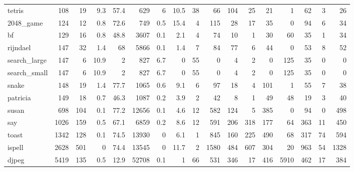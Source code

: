 \begin{tabular}{lrrrrrrrrrrrrrrrr}
 tetris          &      108 &   19 &    9.3 &     57.4 &     629 &    6   &     10.5 &    38 &      66 &  104 &    25 &    21 &     1 &    62 &      3 &        26 \\
 2048\_game       &      124 &   12 &    0.8 &     72.6 &     749 &    0.5 &     15.4 &     4 &     115 &   28 &    17 &    35 &     0 &    94 &      6 &        34 \\
 bf              &      129 &   16 &    0.8 &     48.8 &    3607 &    0.1 &      2.1 &     4 &      74 &   10 &     1 &    30 &    60 &    35 &      1 &        34 \\
 rijndael        &      147 &   32 &    1.4 &     68   &    5866 &    0.1 &      1.4 &     7 &      84 &   77 &     6 &    44 &     0 &    53 &      8 &        52 \\
 search\_large    &      147 &    6 &   10.9 &      2   &     827 &    6.7 &      0   &    55 &       0 &    4 &     2 &     0 &   125 &    35 &      0 &         0 \\
 search\_small    &      147 &    6 &   10.9 &      2   &     827 &    6.7 &      0   &    55 &       0 &    4 &     2 &     0 &   125 &    35 &      0 &         0 \\
 snake           &      148 &   19 &    1.4 &     77.7 &    1065 &    0.6 &      9.1 &     6 &      97 &   18 &     4 &   101 &     1 &    55 &      7 &        38 \\
 patricia        &      149 &   18 &    0.7 &     46.3 &    1087 &    0.2 &      3.9 &     2 &      42 &    8 &     1 &    49 &    48 &    19 &      3 &        40 \\
 susan           &      698 &  104 &    0.1 &     77.2 &   12656 &    0.1 &      4.6 &    12 &     582 &  124 &     5 &   385 &     0 &    94 &      0 &       498 \\
 say             &     1026 &  159 &    0.5 &     67.1 &    6859 &    0.2 &      8.6 &    12 &     591 &  206 &   318 &   177 &    64 &   363 &     11 &       450 \\
 toast           &     1342 &  128 &    0.1 &     74.5 &   13930 &    0   &      6.1 &     1 &     845 &  160 &   225 &   490 &    68 &   317 &     74 &       594 \\
 ispell          &     2628 &  501 &    0   &     74.4 &   13545 &    0   &     11.7 &     2 &    1580 &  484 &   607 &   304 &    20 &   963 &     54 &      1328 \\
 djpeg           &     5419 &  135 &    0.5 &     12.9 &   52708 &    0.1 &      1   &    66 &     531 &  346 &    17 &   416 &  5910 &   462 &     17 &       384 \\

\end{tabular}
